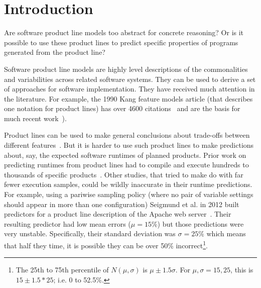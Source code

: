 \documentclass{sig-alternative}
\begin{document}
 

 
\section{Introduction}
 
 Are software  product line models too abstract for concrete reasoning?
Or is it possible to use these product lines to predict specific properties 
of programs generated from the product line? 

Software product line models are highly level descriptions of the commonalities and variabilities   across related software systems. They can be used to derive a set of approaches for software implementation. 
They have received much attention in the literature.
For example, the 1990 Kang feature models article (that describes one notation for product lines) has over 4600 citations~\cite{kang1990feature} and are the basis for 
much recent work~\cite{lopez15,harman14,sayyad13a,sayyad13b}).

 Product lines can be used to make general conclusions about trade-offs between different features~\cite{sayyad13a,sayyad13b}. 
But it is harder to use
such product lines to make
predictions about, say, the expected software runtimes of planned products. Prior work on predicting runtimes from product lines had  to compile and execute
hundreds to thousands of specific products~\cite{guo2013variability}. 
Other studies, that tried to make do with   far fewer execution samples, could
be wildly inaccurate in their runtime predictions. For example, using  a pariwise sampling policy (where no pair of 
 variable settings should appear in more than one configuration) Seigmund et al. in 2012 built predictors for a product line description of the Apache web server~\cite{siegmund2012predicting}. Their resulting predictor had low mean errors ($\mu=15$\%)  but those predictions
 were very unstable. Specifically, their standard deviation
 was $\sigma=25\%$ which means that half they time, it is possible  they can be over 50\% incorrect\footnote{The
 25th to 75th percentile of  $N(\mu,\sigma)$ is   $\mu \pm 1.5\sigma$.
 For \mbox{$\mu,\sigma=15,25$}, this is $15 \pm 1.5*25$; i.e. 0 to 52.5\%.}.
 
\end{document}
